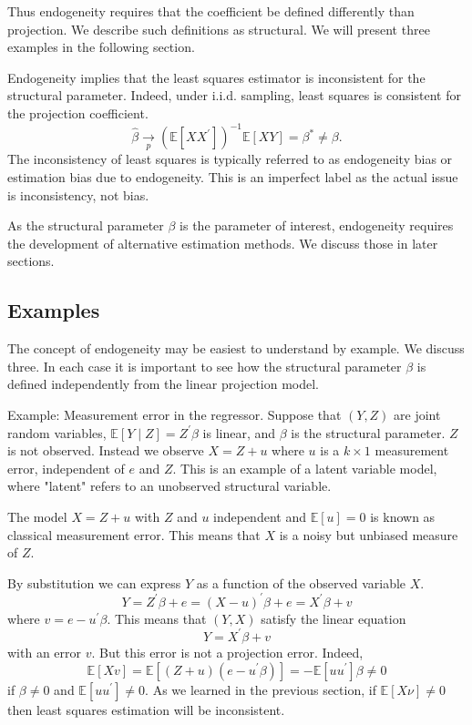 \documentclass[10pt]{article}
\begin{document}
Thus endogeneity requires that the coefficient be defined differently than projection. We describe such definitions as structural. We will present three examples in the following section.

Endogeneity implies that the least squares estimator is inconsistent for the structural parameter. Indeed, under i.i.d. sampling, least squares is consistent for the projection coefficient.
$$
\widehat{\beta} \underset{p}{\longrightarrow}\left(\mathbb{E}\left[X X^{\prime}\right]\right)^{-1} \mathbb{E}[X Y]=\beta^{*} \neq \beta .
$$
The inconsistency of least squares is typically referred to as endogeneity bias or estimation bias due to endogeneity. This is an imperfect label as the actual issue is inconsistency, not bias.

As the structural parameter $\beta$ is the parameter of interest, endogeneity requires the development of alternative estimation methods. We discuss those in later sections.

\subsection{Examples}
The concept of endogeneity may be easiest to understand by example. We discuss three. In each case it is important to see how the structural parameter $\beta$ is defined independently from the linear projection model.

Example: Measurement error in the regressor. Suppose that $(Y, Z)$ are joint random variables, $\mathbb{E}[Y \mid Z]=Z^{\prime} \beta$ is linear, and $\beta$ is the structural parameter. $Z$ is not observed. Instead we observe $X=Z+u$ where $u$ is a $k \times 1$ measurement error, independent of $e$ and $Z$. This is an example of a latent variable model, where "latent" refers to an unobserved structural variable.

The model $X=Z+u$ with $Z$ and $u$ independent and $\mathbb{E}[u]=0$ is known as classical measurement error. This means that $X$ is a noisy but unbiased measure of $Z$.

By substitution we can express $Y$ as a function of the observed variable $X$.
$$
Y=Z^{\prime} \beta+e=(X-u)^{\prime} \beta+e=X^{\prime} \beta+v
$$
where $v=e-u^{\prime} \beta$. This means that $(Y, X)$ satisfy the linear equation
$$
Y=X^{\prime} \beta+v
$$
with an error $v$. But this error is not a projection error. Indeed,
$$
\mathbb{E}[X v]=\mathbb{E}\left[(Z+u)\left(e-u^{\prime} \beta\right)\right]=-\mathbb{E}\left[u u^{\prime}\right] \beta \neq 0
$$
if $\beta \neq 0$ and $\mathbb{E}\left[u u^{\prime}\right] \neq 0$. As we learned in the previous section, if $\mathbb{E}[X \nu] \neq 0$ then least squares estimation will be inconsistent.
\end{document}
